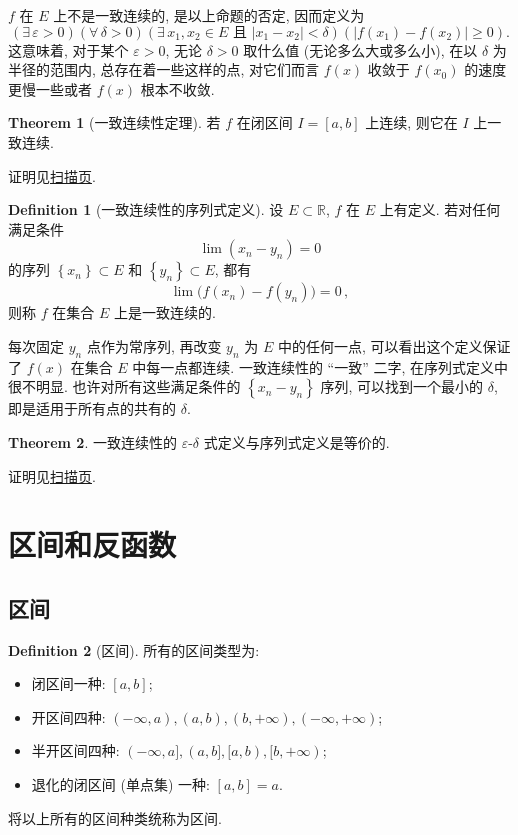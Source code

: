 \documentclass{book}
\newcommand{\Exists}{\exists\,}
\newcommand{\Any}{\forall\,}
\newcommand{\set}[1]{\left\{#1\right\}}
\newcommand{\abs}[1]{\left\lvert #1 \right\rvert}
\newcommand{\R}{\mathbb{R}}
\renewcommand{\ge}{\geqslant}
\numberwithin{equation}{section}
\numberwithin{figure}{section}
\theoremstyle{definition}
\newtheorem{definition}{Definition}
\newtheorem{theorem}{Theorem}[section]
\begin{document}
$f$ 在 $E$ 上不是一致连续的, 是以上命题的否定, 因而定义为
\begin{equation*}
  (\Exists \varepsilon>0)(\Any\delta>0)(\Exists x_1,x_2\in E \text{ 且 }\abs{x_1-x_2}<\delta)(\abs{f(x_1)-f(x_2)}\ge0).
\end{equation*}
这意味着, 对于某个 $\varepsilon>0$, 无论 $\delta>0$ 取什么值 (无论多么大或多么小), 在以 $\delta$ 为半径的范围内, 总存在着一些这样的点, 对它们而言 $f(x)$ 收敛于 $f(x_0)$ 的速度更慢一些或者 $f(x)$ 根本不收敛.

\begin{theorem}[一致连续性定理]
  若 $f$ 在闭区间 $I=[a,b]$ 上连续, 则它在 $I$ 上一致连续.
\end{theorem}
证明见\hyperlink{proof:yizhilianxuxingdingli}{扫描页}.

\begin{definition}[一致连续性的序列式定义]
  设 $E\subset\R$, $f$ 在 $E$ 上有定义. 若对任何满足条件
  \begin{equation*}
    \lim (x_n-y_n)=0
  \end{equation*}
  的序列 $\set{x_n}\subset E$ 和 $\set{y_n}\subset E$, 都有
  \begin{equation*}
    \lim \big( f(x_n)-f(y_n) \big)=0\,,
  \end{equation*}
  则称 $f$ 在集合 $E$ 上是一致连续的.
\end{definition}
每次固定 $y_n$ 点作为常序列, 再改变 $y_n$ 为 $E$ 中的任何一点, 可以看出这个定义保证了 $f(x)$ 在集合 $E$ 中每一点都连续.
一致连续性的 ``一致'' 二字, 在序列式定义中很不明显. 也许对所有这些满足条件的 $\set{x_n-y_n}$ 序列, 可以找到一个最小的 $\delta$, 即是适用于所有点的共有的 $\delta$.

\begin{theorem}
  一致连续性的 $\varepsilon$-$\delta$ 式定义与序列式定义是等价的.
\end{theorem}
证明见\hyperlink{proof:yizhilianxuxingTwoDefinitions}{扫描页}.
%
\section{区间和反函数}
\subsection{区间}
\begin{definition}[区间]
  所有的区间类型为:
  \begin{itemize}
    \item 闭区间一种: $[a,b]$;
    \item 开区间四种: $(-\infty,a),(a,b),(b,+\infty),(-\infty,+\infty)$;
    \item 半开区间四种: $(-\infty,a],(a,b],[a,b),[b,+\infty)$;
    \item 退化的闭区间 (单点集) 一种: $[a,b]={a}$.
  \end{itemize}
  将以上所有的区间种类统称为区间.
\end{definition}
\end{document}
